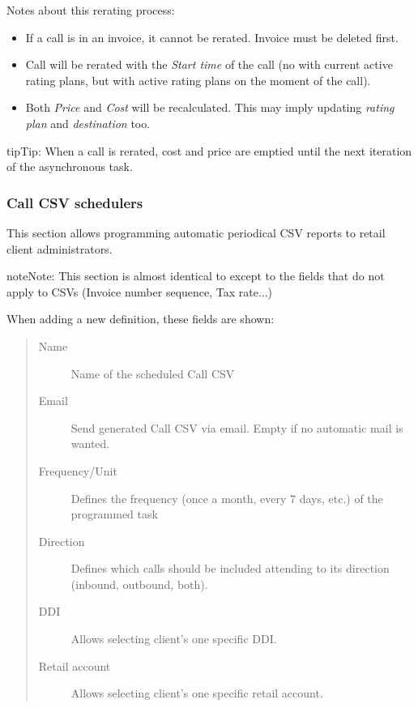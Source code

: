 \documentclass[letterpaper,10pt,english]{sphinxmanual}
\begin{document}
Notes about this rerating process:
\begin{itemize}
\item {} 
If a call is in an invoice, it cannot be rerated. Invoice must be deleted first.

\item {} 
Call will be rerated with the \emph{Start time} of the call (no with current active rating plans, but with active rating plans
on the moment of the call).

\item {} 
Both \emph{Price} and \emph{Cost} will be recalculated. This may imply updating \emph{rating plan} and \emph{destination} too.

\end{itemize}

\begin{notice}{tip}{Tip:}
When a call is rerated, cost and price are emptied until the next iteration of the asynchronous task.
\end{notice}


\subsubsection{Call CSV schedulers}
\label{administration_portal/client/retail/calls/call_csv_schedulers:call-csv-schedulers}\label{administration_portal/client/retail/calls/call_csv_schedulers::doc}
This section allows programming automatic periodical CSV reports to retail client administrators.

\begin{notice}{note}{Note:}
This section is almost identical to {\hyperref[administration_portal/brand/invoicing/invoice_schedulers:invoice\string-schedulers]{}} except to the
fields that do not apply to CSVs (Invoice number sequence, Tax rate...)
\end{notice}

When adding a new definition, these fields are shown:
\begin{quote}
\begin{description}
\item[{Name}] \leavevmode
Name of the scheduled Call CSV

\item[{Email}] \leavevmode
Send generated Call CSV via email. Empty if no automatic mail is wanted.

\item[{Frequency/Unit}] \leavevmode
Defines the frequency (once a month, every 7 days, etc.) of the programmed task

\item[{Direction}] \leavevmode
Defines which calls should be included attending to its direction (inbound, outbound, both).

\item[{DDI}] \leavevmode
Allows selecting client's one specific DDI.

\item[{Retail account}] \leavevmode
Allows selecting client's one specific retail account.

\end{description}
\end{quote}
\end{document}
